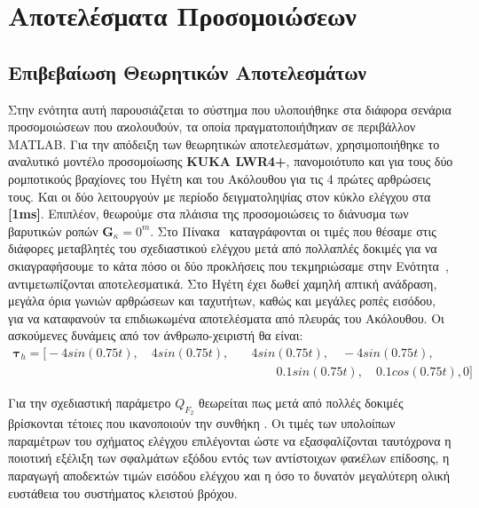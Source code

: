 \chapter{Αποτελέσματα Προσομοιώσεων} \label{Chapter3}

\section{Επιβεβαίωση Θεωρητικών Αποτελεσμάτων} \label{Chapter3Section1}

Στην ενότητα αυτή παρουσιάζεται το σύστημα που υλοποιήθηκε στα διάφορα σενάρια προσομοιώσεων που αϰολουϑούν, τα οποία πραγματοποιήϑηϰαν σε περιβάλλον MATLAB. Για την απόδειξη των θεωρητικών αποτελεσμάτων, χρησιμοποιήθηκε το αναλυτικό μοντέλο προσομοίωσης \textbf{KUKA LWR4+}, πανομοιότυπο και για τους δύο ρομποτικούς βραχίονες του Ηγέτη και του Ακόλουθου για τις 4 πρώτες αρθρώσεις τους. Και οι δύο λειτουργούν με περίοδο δειγματοληψίας στον κύκλο ελέγχου στα \textbf{[1ms]}. Επιπλέον, θεωρούμε στα πλάισια της προσομοιώσεις το διάνυσμα των βαρυτικών ροπών $\mathbf{G}_{\kappa} = 0^{m}$. Στο Πίνακα~ καταγράφονται οι τιμές που θέσαμε στις διάφορες μεταβλητές του σχεδιαστικού ελέγχου μετά από πολλαπλές δοκιμές για να σκιαγραφήσουμε το κάτα πόσο οι δύο προκλήσεις που τεκμηριώσαμε στην Ενότητα~, αντιμετωπίζονται αποτελεσματικά. Στο Ηγέτη έχει δωθεί χαμηλή απτική ανάδραση, μεγάλα όρια γωνιών αρθρώσεων και ταχυτήτων, καθώς και μεγάλες ροπές εισόδου, για να καταφανούν τα επιδιωκωμένα αποτελέσματα από πλευράς του Ακόλουθου.
Οι ασκούμενες δυνάμεις από τον άνθρωπο-χειριστή θα είναι:
\begin{align*}
    \mathbf{\tau}_{h} = \big[-4sin(0.75t),\quad 4sin(0.75t), \quad &4sin(0.75t), \quad -4sin(0.75t), \\ &\qquad0.1sin(0.75t), \quad0.1cos(0.75t), 0\big]
\end{align*}

\bigskip
Για την σχεδιαστική παράμετρο $Q_{F_{2}}$ θεωρείται πως μετά από πολλές δοκιμές βρίσκονται τέτοιες που ικανοποιούν την συνθήκη . Οι τιμές των υπολοίπων παραμέτρων του σχήματος ελέγχου επιλέγονται ώστε να εξασφαλίζονται ταυτόχρονα η ποιοτιϰή εξέλιξη των σφαλμάτων εξόδου εντός των αντίστοιχων φαϰέλων επίδοσης, η παραγωγή αποδεϰτών τιμών εισόδου ελέγχου ϰαι η όσο το δυνατόν μεγαλύτερη ολική ευστάθεια του συστήματος κλειστού βρόχου.

